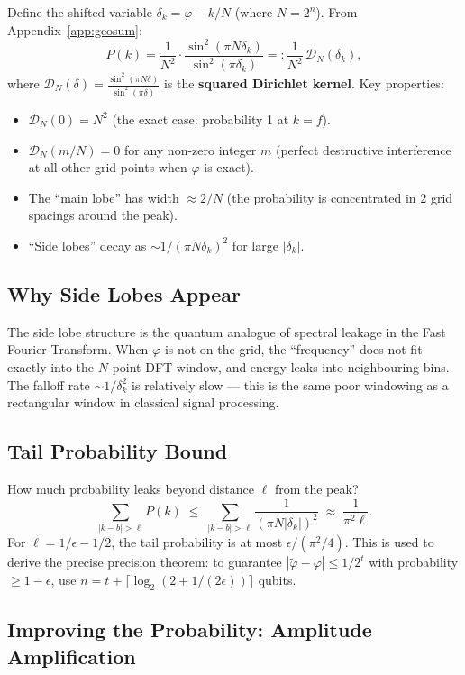 \documentclass[12pt,a4paper]{article}
\begin{document}
Define the shifted variable $\delta_k = \varphi - k/N$ (where $N=2^n$).
From Appendix~\ref{app:geosum}:
\[
  P(k) = \frac{1}{N^2}\cdot\frac{\sin^2(\pi N \delta_k)}{\sin^2(\pi \delta_k)}
       =: \frac{1}{N^2}\,\mathcal{D}_N(\delta_k),
\]
where $\mathcal{D}_N(\delta) = \frac{\sin^2(\pi N\delta)}{\sin^2(\pi\delta)}$
is the \textbf{squared Dirichlet kernel}.  Key properties:
\begin{itemize}[leftmargin=*]
  \item $\mathcal{D}_N(0) = N^2$ (the exact case: probability 1 at $k=f$).
  \item $\mathcal{D}_N(m/N) = 0$ for any non-zero integer $m$ (perfect
        destructive interference at all other grid points when $\varphi$ is exact).
  \item The ``main lobe'' has width $\approx 2/N$ (the probability is
        concentrated in 2 grid spacings around the peak).
  \item ``Side lobes'' decay as $\sim 1/(\pi N \delta_k)^2$ for large $|\delta_k|$.
\end{itemize}

\subsection{Why Side Lobes Appear}

The side lobe structure is the quantum analogue of spectral leakage in the
Fast Fourier Transform.  When $\varphi$ is not on the grid, the ``frequency''
does not fit exactly into the $N$-point DFT window, and energy leaks into
neighbouring bins.  The falloff rate $\sim 1/\delta_k^2$ is relatively slow
— this is the same poor windowing as a rectangular window in classical
signal processing.

\subsection{Tail Probability Bound}

How much probability leaks beyond distance $\ell$ from the peak?
\[
  \sum_{|k-b| > \ell} P(k)
  \;\leq\; \sum_{|k-b|>\ell} \frac{1}{(\pi N|\delta_k|)^2}
  \;\approx\; \frac{1}{\pi^2 \ell}.
\]
For $\ell = 1/\epsilon - 1/2$, the tail probability is at most $\epsilon/(\pi^2/4)$.
This is used to derive the precise precision theorem:
to guarantee $|\tilde\varphi - \varphi| \leq 1/2^t$ with probability
$\geq 1-\epsilon$, use $n = t + \lceil\log_2(2+1/(2\epsilon))\rceil$ qubits.

\subsection{Improving the Probability: Amplitude Amplification}
\end{document}
